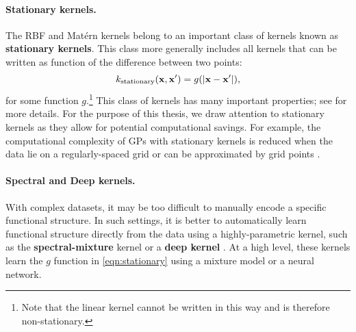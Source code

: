 \paragraph{Stationary kernels.}
The RBF and Mat\'ern kernels belong to an important class of kernels known as {\bf stationary kernels}.
This class more generally includes all kernels that can be written as function of the difference between two points:
\begin{equation}
  k_\text{stationary} (\mathbf{x}, \mathbf{x}') = g( \vert \mathbf{x} - \mathbf{x}' \vert ),
  \label{eqn:stationary}
\end{equation}
for some function $g$.\footnote{
  Note that the linear kernel cannot be written in this way and is therefore non-stationary.
}
This class of kernels has many important properties; see \citep[e.g.][]{rasmussen2006gaussian,wilson2013gaussian} for more details.
For the purpose of this thesis, we draw attention to stationary kernels as they allow for potential computational savings.
For example, the computational complexity of GPs with stationary kernels is reduced when the data lie on a regularly-spaced grid \cite{cunningham2008fast,saatcci2012scalable} or can be approximated by grid points \cite{wilson2014thesis,wilson2015kernel}.


\paragraph{Spectral and Deep kernels.}
With complex datasets, it may be too difficult to manually encode a specific functional structure.
In such settings, it is better to automatically learn functional structure directly from the data using a highly-parametric kernel, such as the {\bf spectral-mixture} kernel \cite{wilson2013gaussian} or a {\bf deep kernel} \cite{wilson2016deep}.
At a high level, these kernels learn the $g$ function in \cref{eqn:stationary} using a mixture model or a neural network.

